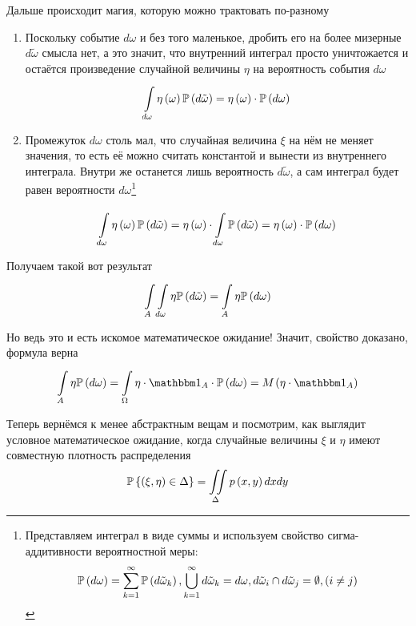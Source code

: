 Дальше происходит магия, которую можно трактовать по-разному
\begin{enumerate}[label=\bfseries Формулировка \arabic*:]
    \item Поскольку событие $d\omega$ и без того маленькое,
        дробить его на более мизерные $d\tilde{\omega}$ смысла нет,
        а это значит, что внутренний интеграл просто уничтожается
        и остаётся произведение случайной величины $\eta$
        на вероятность события $d\omega$
        $$\integralc{d\omega}{}{\probability{d\tilde{\omega}}}{
            \eta\left( \omega \right)}
            = \eta\left( \omega \right) \cdot \probability{d\omega}$$
    \item Промежуток $d\omega$ столь мал,
        что случайная величина $\xi$ на нём не меняет значения,
        то есть её можно считать константой и вынести из внутреннего интеграла.
        Внутри же останется лишь вероятность $d\tilde{\omega}$,
        а сам интеграл будет равен вероятности $d\omega$\footnote{
        Представляем интеграл в виде суммы и используем свойство
        сигма-аддитивности вероятностной меры:
        $$\probability{d\omega}
            = \sum_{k=1}^\infty \probability{d\tilde{\omega}_k},
            \bigcup_{k=1}^\infty d\tilde{\omega}_k = d\omega,
            d\tilde{\omega}_i \cap d\tilde{\omega}_j = \emptyset,
            \left( i \neq j \right)$$}

        $$\integralc{d\omega}{}{\probability{d\tilde{\omega}}}{
            \eta\left( \omega \right)}
            = \eta\left( \omega \right)
                \cdot \integralc{d\omega}{}{\probability{d\tilde{\omega}}}{}
            = \eta\left( \omega \right) \cdot \probability{d\omega}$$
\end{enumerate}

Получаем такой вот результат
$$\int\limits_A \integralc{d\omega}{}{\probability{d\tilde{\omega}}}{\eta}
    = \integralc{A}{}{\probability{d\omega}}{\eta}$$

Но ведь это и есть искомое математическое ожидание!
Значит, свойство доказано, формула верна
$$\integralc{A}{}{\probability{d\omega}}{\eta}
    = \integralc{\Omega}{}{\probability{d\omega}}{
        \eta \cdot \indicatorof{A} \cdot}
    = \mean{\left( \eta \cdot \indicatorof{A} \right)}$$

Теперь вернёмся к менее абстрактным вещам и посмотрим,
как выглядит условное математическое ожидание,
когда случайные величины $\xi$ и $\eta$ имеют совместную плотность распределения
$$\Probability{\left( \xi, \eta \right) \in \Delta}
    = \iint\limits_\Delta\pdf{x,y}dxdy$$

